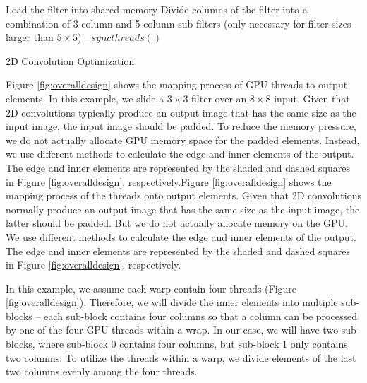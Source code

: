\begin{algorithm}
\small
	Load the filter into shared memory\;
	Divide columns of the filter into a combination of 3-column and 5-column sub-filters (only necessary for filter sizes larger than $5 \times 5$)\;
	$\_\_syncthreads()$\;
	\caption{2D Convolution Optimization}
	\label{algo:overalldesign}
\end{algorithm}

Figure \ref{fig:overalldesign} shows the mapping process of GPU threads to output elements. In this example, we slide a $3 \times 3$ filter
over an $8 \times 8$ input.  Given that 2D convolutions typically produce an output image that has the same size as the input image, the
input image should be padded. To reduce the memory pressure, we do not actually allocate GPU memory space for the padded elements. Instead,
we use different methods to calculate the edge and inner elements of the output. The edge and inner elements are represented by the shaded
and dashed squares in Figure \ref{fig:overalldesign}, respectively.Figure \ref{fig:overalldesign} shows the mapping process of the threads
onto output elements. Given that 2D convolutions normally produce an output image that has the same size as the input image, the latter
should be padded. But we do not actually allocate memory on the GPU. We use different methods to calculate the edge and inner elements of
the output. The edge and inner elements are represented by the shaded and dashed squares in Figure \ref{fig:overalldesign}, respectively.


In this example, we assume each warp contain four threads (Figure \ref{fig:overalldesign}). Therefore, we will divide the inner elements
into multiple sub-blocks – each sub-block contains four columns so that a column can be processed by one of the four GPU threads within a
wrap. In our case, we will have two sub-blocks, where sub-block 0 contains four columns, but sub-block 1 only contains two columns. To
utilize the threads within a warp, we divide elements of the last two columns evenly among the four threads.

